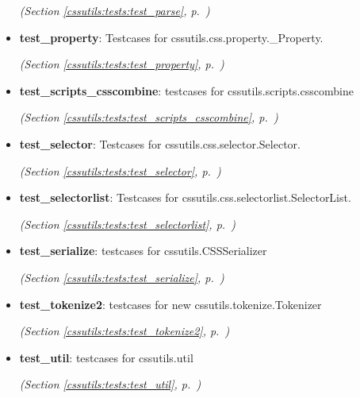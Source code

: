 \begin{itemize}
  \textit{(Section \ref{cssutils:tests:test_parse}, p.~\pageref{cssutils:tests:test_parse})}

\item \textbf{test\_property}: Testcases for cssutils.css.property.\_Property.



  \textit{(Section \ref{cssutils:tests:test_property}, p.~\pageref{cssutils:tests:test_property})}

\item \textbf{test\_scripts\_csscombine}: testcases for cssutils.scripts.csscombine



  \textit{(Section \ref{cssutils:tests:test_scripts_csscombine}, p.~\pageref{cssutils:tests:test_scripts_csscombine})}

\item \textbf{test\_selector}: Testcases for cssutils.css.selector.Selector.



  \textit{(Section \ref{cssutils:tests:test_selector}, p.~\pageref{cssutils:tests:test_selector})}

\item \textbf{test\_selectorlist}: Testcases for cssutils.css.selectorlist.SelectorList.



  \textit{(Section \ref{cssutils:tests:test_selectorlist}, p.~\pageref{cssutils:tests:test_selectorlist})}

\item \textbf{test\_serialize}: testcases for cssutils.CSSSerializer



  \textit{(Section \ref{cssutils:tests:test_serialize}, p.~\pageref{cssutils:tests:test_serialize})}

\item \textbf{test\_tokenize2}: testcases for new cssutils.tokenize.Tokenizer



  \textit{(Section \ref{cssutils:tests:test_tokenize2}, p.~\pageref{cssutils:tests:test_tokenize2})}

\item \textbf{test\_util}: testcases for cssutils.util



  \textit{(Section \ref{cssutils:tests:test_util}, p.~\pageref{cssutils:tests:test_util})}

\end{itemize}

